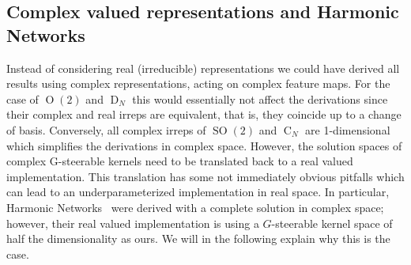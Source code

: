 \documentclass{article}
\renewcommand{\O}[1]{\ensuremath{\operatorname{O}(#1)}}
\newcommand{\SO}[1]{\ensuremath{\operatorname{SO}(#1)}}
\newcommand{\DN}{\ensuremath{\operatorname{D}_{\!N}}}
\newcommand{\CN}{\ensuremath{\operatorname{C}_{\!N}}}
\begin{document}
\subsection{Complex valued representations and Harmonic Networks}
\label{apx:incompleteness_hnets}


Instead of considering real (irreducible) representations we could have derived all results using complex representations, acting on complex feature maps.
For the case of $\O2$ and $\DN$ this would essentially not affect the derivations since their complex and real irreps are equivalent, that is, they coincide up to a change of basis.
Conversely, all complex irreps of $\SO2$ and $\CN$ are 1-dimensional which simplifies the derivations in complex space.
However, the solution spaces of complex G-steerable kernels need to be translated back to a real valued implementation.
This translation has some not immediately obvious pitfalls which can lead to an underparameterized implementation in real space.
In particular, Harmonic Networks~\cite{Worrall2017-HNET} were derived with a complete solution in complex space; however, their real valued implementation is using a $G$-steerable kernel space of half the dimensionality as ours.
We will in the following explain why this is the case.
\end{document}
